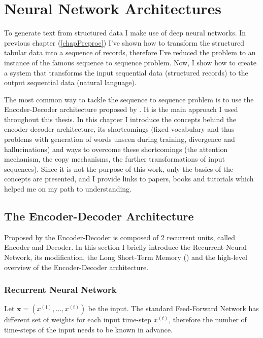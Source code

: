 \chapter{Neural Network Architectures}
To generate text from structured data I make use of deep neural networks. In previous chapter (\ref{chapPreproc}) I've shown how to transform the structured tabular data into a sequence of records, therefore I've reduced the problem to an instance of the famous sequence to sequence problem. Now, I show how to create a system that transforms the input sequential data (structured records) to the output sequential data (natural language).

The most common way to tackle the sequence to sequence problem is to use the Encoder-Decoder architecture proposed by \citep{sutskever2014sequence}. It is the main approach I used throughout this thesis. In this chapter I introduce the concepts behind the encoder-decoder architecture, its shortcomings (fixed vocabulary and thus problems with generation of words unseen during training, divergence and hallucinations) and ways to overcome these shortcomings (the attention mechanism, the copy mechanisms, the further transformations of input sequences). Since it is not the purpose of this work, only the basics of the concepts are presented, and I provide links to papers, books and tutorials which helped me on my path to understanding.

\section {The Encoder-Decoder Architecture}

Proposed by \citep{sutskever2014sequence} the Encoder-Decoder is composed of 2 recurrent units, called Encoder and Decoder. In this section I briefly introduce the Recurrent Neural Network, its modification, the Long Short-Term Memory (\citep{hochreiter1997}) and the high-level overview of the Encoder-Decoder architecture.

\subsection{Recurrent Neural Network}

Let $\mathbf{x}=(x^{(1)},\dots,x^{(t)})$ be the input. The standard Feed-Forward Network has different set of weights for each input time-step $x^{(t)}$, therefore the number of time-steps of the input needs to be known in advance.

